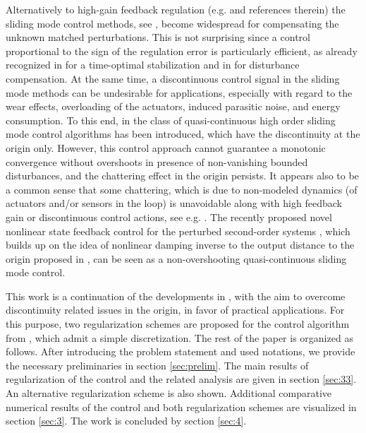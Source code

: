 \documentclass[letterpaper, 10 pt, conference]{ieeeconf}  %
\begin{document}
Alternatively to high-gain feedback regulation (e.g. \cite{ilchmann2008} and references therein)
the sliding mode control methods, see \cite{shtessel2014,utkin2020}, become widespread for
compensating the unknown matched perturbations. This is not surprising since a control proportional to the sign of the regulation error is particularly efficient, as already recognized in \cite{fuller1960,haimo1986} for a time-optimal stabilization and in \cite{Tsypkin1984relay} for disturbance compensation. At the same time, a discontinuous control signal in the sliding mode methods can be undesirable for applications, especially with regard to the wear effects, overloading of the actuators, induced parasitic noise, and energy consumption. To this end, in \cite{levant2005} the class of quasi-continuous high order sliding mode control algorithms has been introduced, which have the discontinuity at the origin only. However, this control approach cannot guarantee a monotonic convergence without overshoots in presence of non-vanishing bounded disturbances, and the chattering effect in the origin persists. It appears also to be a common sense that some chattering, which is due to non-modeled dynamics (of actuators and/or sensors in the loop) is unavoidable along with high feedback gain or discontinuous control actions, see e.g. \cite{utkin2015}. The recently proposed novel nonlinear state feedback control for the perturbed second-order systems \cite{ruderman2024robust}, which builds up on the idea of nonlinear damping inverse to the output distance to the origin proposed in \cite{ruderman2021a}, can be seen as a non-overshooting quasi-continuous sliding mode control. 

This work is a continuation of the developments in \cite{ruderman2024robust}, with the aim to overcome discontinuity related issues in the origin, in favor of practical applications. For this purpose, two regularization schemes are proposed for the control algorithm from \cite{ruderman2024robust}, which admit a simple discretization.
The rest of the paper is organized as follows. After introducing the problem statement and used notations, we provide the necessary preliminaries in section \ref{sec:prelim}. The main results of regularization of the control \cite{ruderman2024robust} and the related analysis are given in section \ref{sec:33}. An alternative regularization scheme is also shown. Additional comparative numerical results of the control \cite{ruderman2024robust} and both regularization schemes are visualized in section \ref{sec:3}. The work is concluded by section \ref{sec:4}. 
\end{document}
